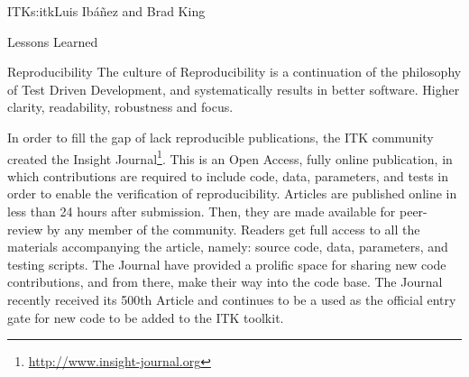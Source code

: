 \begin{aosachapter}{ITK}{s:itk}{Luis Ib\'{a}\~{n}ez and Brad King}
\begin{aosasect1}{Lessons Learned}
\begin{aosasect2}{Reproducibility}
The culture of Reproducibility is a continuation of the philosophy of Test
Driven Development, and systematically results in better software. Higher
clarity, readability, robustness and focus.

In order to fill the gap of lack reproducible publications, the ITK community
created the Insight Journal\footnote{\url{http://www.insight-journal.org}}.
This is an Open Access, fully online publication, in which contributions are
required to include code, data, parameters, and tests in order to enable the
verification of reproducibility. Articles are published online in less than 24
hours after submission. Then, they are made available for peer-review by any
member of the community. Readers get full access to all the materials
accompanying the article, namely: source code, data, parameters, and testing
scripts. The Journal have provided a prolific space for sharing new code
contributions, and from there, make their way into the code base. The Journal
recently received its 500th Article and continues to be a used as the official
entry gate for new code to be added to the ITK toolkit.
\end{aosasect2}

\end{aosasect1}

\end{aosachapter}
